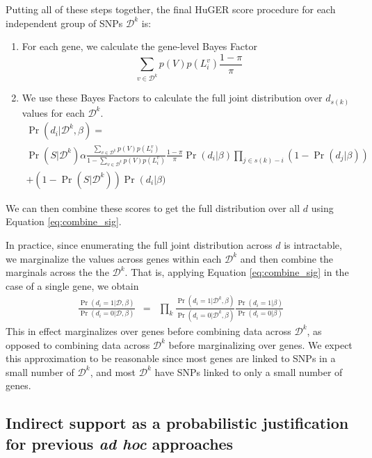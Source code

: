Putting all of these steps together, the final HuGER score procedure
for each independent group of SNPs $\mathcal{D}^k$ is:
\begin{enumerate}
  \item For each gene, we calculate the gene-level
    Bayes Factor
    \[\sum_{v \in \mathcal{D}^k} p(V) p(L_i^v) \frac{1-\pi}{\pi}\]
  \item We use these Bayes Factors to calculate the full joint
      distribution over $d_{s(k)}$ values for each $\mathcal{D}^k$.
\begin{multline}
\Pr\left(d_i|\mathcal{D}^k,\beta\right) = \\ 
  \Pr\left(S|\mathcal{D}^k\right) \alpha \frac{\sum_{v \in \mathcal{D}^k} p(V) p(L_i^v)}{1
    - \sum_{v \in \mathcal{D}^k} p(V) p(L_i^v)}
  \frac{1-\pi}{\pi}\Pr(d_i|\beta)\prod_{j\in s(k)-i}\left(1-\Pr(d_j|\beta)\right)
  \\ + \left(1 - \Pr\left(S|\mathcal{D}^k\right)\right) \Pr\left(d_i\right|\beta)
  \label{huge}
\end{multline}
\end{enumerate}
We can then combine these scores to get the full distribution over all
$d$ using Equation \eqref{eq:combine_sig}.

In practice, since enumerating the full joint distribution across $d$
is intractable, we marginalize the values across genes within each
$\mathcal{D}^k$ and then combine the marginals across the the
$\mathcal{D}^k$. That is, applying Equation \eqref{eq:combine_sig} in
the case of a single gene, we obtain
\begin{eqnarray*}
\frac{\Pr\left(d_i=1|\mathcal{D},\beta\right)}{\Pr\left(d_i=0|\mathcal{D},\beta\right)} &=&
\prod_k\frac{\Pr\left(d_i=1|\mathcal{D}^k,\beta\right)}{\Pr\left(d_i=0|\mathcal{D}^k,\beta\right)}\frac{\Pr\left(d_i=1|\beta\right)}{\Pr\left(d_i=0|\beta\right)}
\end{eqnarray*}
This in effect marginalizes over genes before combining data across
$\mathcal{D}^k$, as opposed to combining data across $\mathcal{D}^k$
before marginalizing over genes. We expect this approximation to be
reasonable since most genes are linked to SNPs in a small number of
$\mathcal{D}^k$, and most $\mathcal{D}^k$ have SNPs linked to only a
small number of genes.

\subsection{Indirect support as a probabilistic justification for
  previous \textit{ad hoc} approaches}

